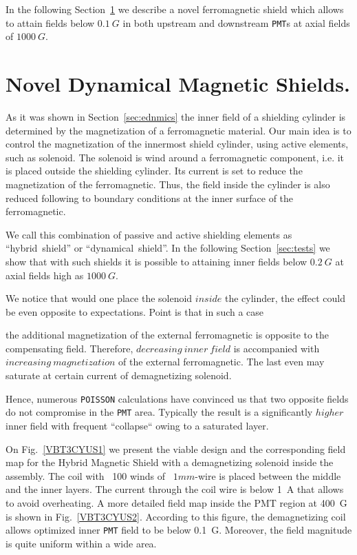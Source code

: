 \documentclass[12pt]{article}
\begin{document}
In the following Section~\ref{sec:novelle} we describe a novel 
ferromagnetic shield which 
allows  to attain fields below $0.1~G$ in both  upstream and
downstream {\tt PMT}s at  axial fields of $1000~G$.

\section{Novel Dynamical Magnetic Shields.}
\label{sec:novelle}

As it was shown in Section~\ref{sec:ednmics} the inner 
field of a shielding cylinder
is determined by the   magnetization  of a ferromagnetic material.  
Our main idea is to control the magnetization of the innermost 
shield cylinder, using active elements, such as solenoid. 
The  solenoid  is  wind  around a ferromagnetic component, 
i.e. it is placed outside the 
shielding cylinder.  Its  current
is set to reduce the  magnetization of the ferromagnetic. 
Thus, the field inside the cylinder is also 
reduced following to boundary conditions at the  
inner surface of the ferromagnetic.

We call this  combination  of passive  and active shielding 
elements  as ``hybrid~shield'' or 
``dynamical~shield''. In the following Section~\ref{sec:tests}  
we show that with such shields  
it is possible to  attaining inner fields below $0.2~G$
at axial fields high as $1000~G$.

We notice that would one  place the solenoid  $inside$ the cylinder, 
the  effect could  be even opposite to expectations.
Point is that in such a case%
 
the additional   magnetization of the  external  
ferromagnetic is opposite to the compensating field. 
Therefore, $decreasing~inner~field$  is accompanied with 
$increasing~magnetization$ of the external ferromagnetic.
The last   even  may  saturate at certain  
current of demagnetizing solenoid.

 
Hence, numerous {\tt POISSON} calculations have convinced us that
two opposite  fields
do not compromise in the {\tt PMT} area.
Typically  the  result is  a significantly $higher$ inner field with frequent
``collapse`` owing to a saturated layer. 

On Fig.~\ref{VBT3CYUS1} we present the viable  design and the corresponding field map  
for the Hybrid Magnetic Shield with a demagnetizing  solenoid inside the assembly. 
The coil with ~100 winds of ~$1 mm$-wire  is placed between the  middle and  the 
inner layers. The current through the coil wire is  below 1~A  that allows to avoid overheating.  
A more detailed  field map inside the PMT region at 400~G  is 
shown in Fig.~\ref{VBT3CYUS2}. According to this figure, the demagnetizing  coil 
allows   optimized   inner {\tt PMT} field  to be  below  0.1~G.
Moreover, the field  magnitude is quite uniform within a wide area.
\end{document}
